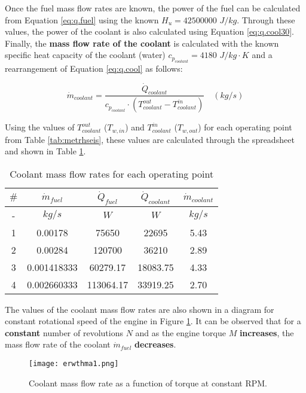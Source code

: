 \documentclass{report}
\begin{document}
Once the fuel mass flow rates are known, the power of the fuel can be calculated from Equation \ref{eq:q.fuel} using the known $H_u = 42500000$ $J/kg$. Through these values, the power of the coolant is also calculated using Equation \ref{eq:q.cool30}. Finally, the \textbf{mass flow rate of the coolant} is calculated with the known specific heat capacity of the coolant (water) $c_{p_{coolant}} = 4180$ $J/kg\cdot K$ and a rearrangement of Equation \ref{eq:q.cool} as follows:

$$\dot{m}_{coolant} = \frac{\dot{Q}_{coolant}}{c_{p_{coolant}} \cdot (T^{out}_{coolant} - T^{in}_{coolant})} \quad (kg/s)$$

Using the values of $T^{out}_{coolant}$ ($T_{w,in}$) and $T^{in}_{coolant}$ ($T_{w,out}$) for each operating point from Table \ref{tab:metrhseis}, these values are calculated through the spreadsheet and shown in Table \ref{tab:finaltable1o}.

\begin{table}[H]
    \centering
    \renewcommand{\arraystretch}{1.2} 
    \begin{tabular}{|c|c|c|c|c|}
    \hline
    \rowcolor{blue}
    $\#$ & $\dot{m}_{fuel}$ & $\dot{Q}_{fuel}$ & $\dot{Q}_{coolant}$ & $\dot{m}_{coolant}$ \\
    \hline
    \rowcolor{gray}
    - & $kg/s$ & $W$ & $W$ & $kg/s$ \\
    \hline
    1 & 0.00178 & 75650 & 22695 & 5.43 \\
    \hline
    2 & 0.00284 & 120700 & 36210 & 2.89\\
    \hline
    3 & 0.001418333 & 60279.17 & 18083.75 & 4.33\\
    \hline
    4 & 0.002660333 & 113064.17 & 33919.25 & 2.70 \\
    \hline 
    \end{tabular}
    \caption{Coolant mass flow rates for each operating point}
    \label{tab:finaltable1o}
\end{table}

The values of the coolant mass flow rates are also shown in a diagram for constant rotational speed of the engine in Figure \ref{fig:m./Torque}. It can be observed that for a \textbf{constant} number of revolutions $N$ and as the engine torque $M$ \textbf{increases}, the mass flow rate of the coolant $\dot{m}_{fuel}$ \textbf{decreases}.

\begin{figure}[!h]
    \centering
    \texttt{[image: erwthma1.png]}
    \caption{Coolant mass flow rate as a function of torque at constant RPM.}
    \label{fig:m./Torque}
\end{figure}
\end{document}
